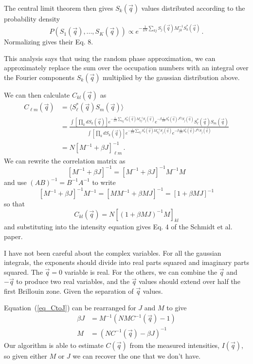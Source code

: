 \documentclass[12pt]{article}
\begin{document}
The central limit theorem then gives
$S_{k}(\vec q)$ values distributed according to the probability density
\begin{equation}
P\left (S_{1}(\vec q),...,S_{K}(\vec q)\right ) \propto
e^{-\frac{1}{2N}\sum_{kj} S_j(\vec q)M_{jk}^{-1} S_k^*(\vec q)} \,.
\end{equation}
Normalizing gives their Eq. 8.

This analysis says that using the random phase approximation, we can
approximately
replace the sum over the occupation numbers with an integral over
the Fourier components $S_k(\vec q)$ multiplied by the gaussian
distribution above.

We can then calculate $C_{kl}(\vec q)$ as
\begin{equation}
\begin{split}
C_{\ell m}(\vec q) &=
\langle S^*_\ell(\vec q) S_m(\vec q)\rangle
\\
&=
\frac{
\int \left [\prod_k dS_k(\vec q)\right ]
e^{-\frac{1}{2N}\sum_{kj} S_k^*(\vec q)M_{kj}^{-1} S_j(\vec q)}
e^{-\beta \frac{1}{2N} S_k^*(\vec q)J^{kj}S_j(\vec q)}
S^*_\ell(\vec q) S_m(\vec q)
}
{\int \left [\prod_k dS_k(\vec q)\right ]
e^{-\frac{1}{2N}\sum_{kj} S_k^*(\vec q)M_{kj}^{-1} S_j(\vec q)}
e^{-\beta \frac{1}{2N} S_k^*(\vec q)J^{kj}S_j(\vec q)}
}
\\
&=N\left [ M^{-1}+\beta J\right ]^{-1}_{\ell m} \,.
\end{split}
\end{equation}
We can rewrite the correlation matrix as
\begin{equation}
\left [ M^{-1}+\beta J\right ]^{-1}
=  
\left [ M^{-1}+\beta J\right ]^{-1} M^{-1} M
\end{equation}
and use $(AB)^{-1} = B^{-1}A^{-1}$ to write
\begin{equation}
\left [ M^{-1}+\beta J\right ]^{-1} M^{-1}
= \left [M M^{-1}+\beta M J\right ]^{-1} = \left [1+\beta MJ\right ]^{-1}
\end{equation}
so that
\begin{equation}
C_{kl}(\vec q) = N \left [\left (1+\beta M J\right)^{-1} M \right ]_{kl}
\label{eq_CtoJ}
\end{equation}
and substituting into the intensity equation gives Eq. 4 of the Schmidt et al.
paper.

I have not been careful about the complex variables. For all the gaussian
integrals, the exponents should divide into real parts squared
and imaginary parts squared. The $\vec q = 0$ variable is real. For the
others, we can combine the $\vec q$ and $-\vec q$ to produce two real
variables, and the $\vec q$ values should extend over half the first
Brillouin zone. Given the separation of $\vec q$ values.

Equation~(\ref{eq_CtoJ}) can be rearranged for $J$ and $M$ to give
\begin{align}
\beta J &= M^{-1} \left(N M C^{-1}(\vec{q}) - 1 \right)
\\
M &=  \left( N C^{-1}(\vec{q}) - \beta J \right)^{-1}
\end{align}
Our algorithm is able to estimate $C(\vec{q})$ from the measured intensities, $I(\vec{q})$, so given either $M$ or $J$ we can recover the one that we don't have.
\end{document}
